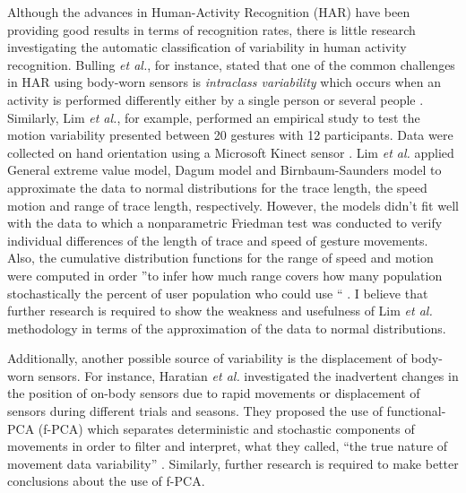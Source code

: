 \documentclass[9pt,journal,onecolumn,compsoc]{IEEEtran}
\begin{document}
Although the advances in Human-Activity Recognition (HAR) have been providing good results in terms of recognition rates,
there is little research investigating the automatic classification of variability in human activity recognition.
Bulling \textit{et al.}, for instance, stated that one of the common challenges in HAR
using body-worn sensors is \textit{intraclass variability} which occurs when
an activity is performed differently either by a single person or several people \cite{bulling2014} .
Similarly, Lim \textit{et al.}, for example, performed an empirical study to test the motion variability
presented between 20 gestures with 12 participants. %
Data were collected on hand orientation using a Microsoft Kinect sensor \cite{Lim2012}. %
Lim \textit{et al.}
applied General extreme value model, Dagum model and Birnbaum-Saunders model
to approximate the data to normal distributions
for the trace length, the speed motion and range of trace length, respectively.
However, the models didn't fit well with the data to which a nonparametric Friedman test
was conducted to verify individual differences
of the length of trace and speed of gesture movements.
Also, the cumulative distribution functions for
the range of speed and motion were computed
in order ''to infer how much range covers how many population stochastically
the percent of user population who could use `` \cite{Lim2012}.
I believe that further research is required to show the weakness and usefulness of
Lim \textit{et al.}  methodology in terms of the approximation of the data to normal distributions.

Additionally, another possible source of variability is the displacement of body-worn sensors.
For instance, Haratian \textit{et al.} investigated the inadvertent changes in the position of on-body sensors
due to rapid movements or displacement of sensors during different trials and seasons.
They proposed the use of functional-PCA (f-PCA)
which separates deterministic and stochastic components of movements
in order to filter and interpret, what they called, ``the true nature of movement data variability''
\cite{Haratian2012,Haratian2014,Haratian2016}. Similarly, further research is required to make
better conclusions about the use of f-PCA.
\end{document}
